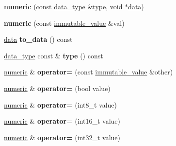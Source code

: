 \begin{DoxyCompactItemize}
{\bfseries numeric} (const \hyperlink{structdialog_1_1data__type}{data\+\_\+type} \&type, void $\ast$\hyperlink{structdialog_1_1data}{data})
\item 
\mbox{\label{classdialog_1_1numeric_ae051a0ba9dc905a91a8c21e7e04f8323}} 
{\bfseries numeric} (const \hyperlink{classdialog_1_1immutable__value}{immutable\+\_\+value} \&val)
\item 
\mbox{\label{classdialog_1_1numeric_aa4cffc0219b07bba63ee1e735215ddc8}} 
\hyperlink{structdialog_1_1data}{data} {\bfseries to\+\_\+data} () const
\item 
\mbox{\label{classdialog_1_1numeric_a3574bf3a7c6d5f525b93baf5b8f4f80d}} 
\hyperlink{structdialog_1_1data__type}{data\+\_\+type} const  \& {\bfseries type} () const
\item 
\mbox{\label{classdialog_1_1numeric_a6bae3d300bc27d5897b10681ca5f8427}} 
\hyperlink{classdialog_1_1numeric}{numeric} \& {\bfseries operator=} (const \hyperlink{classdialog_1_1immutable__value}{immutable\+\_\+value} \&other)
\item 
\mbox{\label{classdialog_1_1numeric_a1d9cce706335fce2662c770ab2db27db}} 
\hyperlink{classdialog_1_1numeric}{numeric} \& {\bfseries operator=} (bool value)
\item 
\mbox{\label{classdialog_1_1numeric_ae5d060b45ce0dfda6991e39eb005a702}} 
\hyperlink{classdialog_1_1numeric}{numeric} \& {\bfseries operator=} (int8\+\_\+t value)
\item 
\mbox{\label{classdialog_1_1numeric_a55fdd2e8c392e96cb9e43e200689ad2f}} 
\hyperlink{classdialog_1_1numeric}{numeric} \& {\bfseries operator=} (int16\+\_\+t value)
\item 
\mbox{\label{classdialog_1_1numeric_a7fb02be82d2ba9509182e3d780d6ec39}} 
\hyperlink{classdialog_1_1numeric}{numeric} \& {\bfseries operator=} (int32\+\_\+t value)
\item 
\mbox{\label{classdialog_1_1numeric_a9db3cbca3382972629efbd796c43794c}} 

\end{DoxyCompactItemize}

